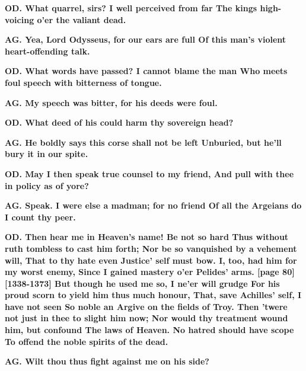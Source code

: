 \documentclass[11pt,letter]{book}
\begin{document}
\par \textbf{OD. What quarrel, sirs? I well perceived from far The kings high-voicing o’er the valiant dead.}
\par 

\par \textbf{AG. Yea, Lord Odysseus, for our ears are full Of this man’s violent heart-offending talk.}
\par 

\par \textbf{OD. What words have passed? I cannot blame the man Who meets foul speech with bitterness of tongue.}
\par 

\par \textbf{AG. My speech was bitter, for his deeds were foul.}
\par 

\par \textbf{OD. What deed of his could harm thy sovereign head?}
\par 

\par \textbf{AG. He boldly says this corse shall not be left Unburied, but he’ll bury it in our spite.}
\par 

\par \textbf{OD. May I then speak true counsel to my friend, And pull with thee in policy as of yore?}
\par 

\par \textbf{AG. Speak. I were else a madman; for no friend Of all the Argeians do I count thy peer.}
\par 

\par \textbf{OD. Then hear me in Heaven’s name! Be not so hard Thus without ruth tombless to cast him forth; Nor be so vanquished by a vehement will, That to thy hate even Justice’ self must bow. I, too, had him for my worst enemy, Since I gained mastery o’er Pelides’ arms. [page 80][1338-1373] But though he used me so, I ne’er will grudge For his proud scorn to yield him thus much honour, That, save Achilles’ self, I have not seen So noble an Argive on the fields of Troy. Then ’twere not just in thee to slight him now; Nor would thy treatment wound him, but confound The laws of Heaven. No hatred should have scope To offend the noble spirits of the dead.}
\par 

\par \textbf{AG. Wilt thou thus fight against me on his side?}
\par 
\end{document}
